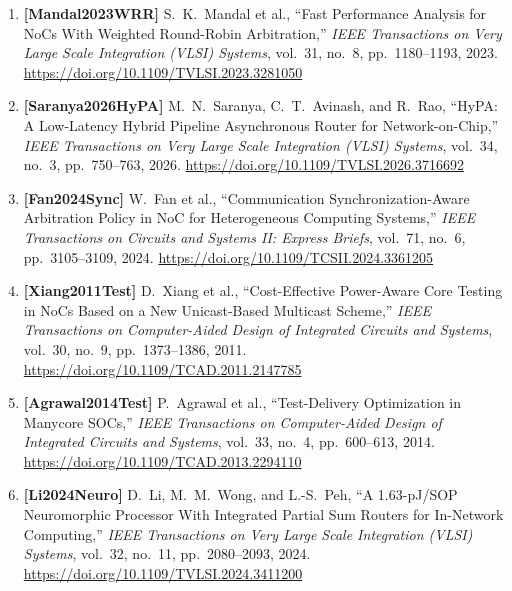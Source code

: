\begin{enumerate}
    \item \textbf{[Mandal2023WRR]} S.~K.~Mandal et al., ``Fast Performance Analysis for NoCs With Weighted Round-Robin Arbitration,'' \emph{IEEE Transactions on Very Large Scale Integration (VLSI) Systems}, vol.~31, no.~8, pp.~1180--1193, 2023. \url{https://doi.org/10.1109/TVLSI.2023.3281050}
    \item \textbf{[Saranya2026HyPA]} M.~N.~Saranya, C.~T.~Avinash, and R.~Rao, ``HyPA: A Low-Latency Hybrid Pipeline Asynchronous Router for Network-on-Chip,'' \emph{IEEE Transactions on Very Large Scale Integration (VLSI) Systems}, vol.~34, no.~3, pp.~750--763, 2026. \url{https://doi.org/10.1109/TVLSI.2026.3716692}
    \item \textbf{[Fan2024Sync]} W.~Fan et al., ``Communication Synchronization-Aware Arbitration Policy in NoC for Heterogeneous Computing Systems,'' \emph{IEEE Transactions on Circuits and Systems II: Express Briefs}, vol.~71, no.~6, pp.~3105--3109, 2024. \url{https://doi.org/10.1109/TCSII.2024.3361205}
    \item \textbf{[Xiang2011Test]} D.~Xiang et al., ``Cost-Effective Power-Aware Core Testing in NoCs Based on a New Unicast-Based Multicast Scheme,'' \emph{IEEE Transactions on Computer-Aided Design of Integrated Circuits and Systems}, vol.~30, no.~9, pp.~1373--1386, 2011. \url{https://doi.org/10.1109/TCAD.2011.2147785}
    \item \textbf{[Agrawal2014Test]} P.~Agrawal et al., ``Test-Delivery Optimization in Manycore SOCs,'' \emph{IEEE Transactions on Computer-Aided Design of Integrated Circuits and Systems}, vol.~33, no.~4, pp.~600--613, 2014. \url{https://doi.org/10.1109/TCAD.2013.2294110}
    \item \textbf{[Li2024Neuro]} D.~Li, M.~M.~Wong, and L.-S.~Peh, ``A 1.63-pJ/SOP Neuromorphic Processor With Integrated Partial Sum Routers for In-Network Computing,'' \emph{IEEE Transactions on Very Large Scale Integration (VLSI) Systems}, vol.~32, no.~11, pp.~2080--2093, 2024. \url{https://doi.org/10.1109/TVLSI.2024.3411200}
\end{enumerate}
